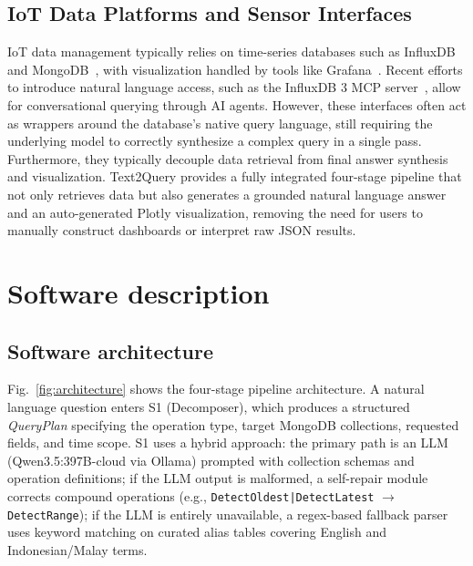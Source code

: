\documentclass[preprint,12pt,a4paper]{elsarticle}
\begin{document}
\subsection{IoT Data Platforms and Sensor Interfaces}
IoT data management typically relies on time-series databases such as InfluxDB~\cite{influxdb} and MongoDB~\cite{mongodb}, with visualization handled by tools like Grafana~\cite{grafana}. Recent efforts to introduce natural language access, such as the InfluxDB 3 MCP server~\cite{influx2025mcp}, allow for conversational querying through AI agents. However, these interfaces often act as wrappers around the database's native query language, still requiring the underlying model to correctly synthesize a complex query in a single pass. Furthermore, they typically decouple data retrieval from final answer synthesis and visualization. Text2Query provides a fully integrated four-stage pipeline that not only retrieves data but also generates a grounded natural language answer and an auto-generated Plotly visualization, removing the need for users to manually construct dashboards or interpret raw JSON results.

\section{Software description}

\subsection{Software architecture}

Fig.~\ref{fig:architecture} shows the four-stage pipeline architecture. A natural language question enters S1 (Decomposer), which produces a structured \emph{QueryPlan} specifying the operation type, target MongoDB collections, requested fields, and time scope. S1 uses a hybrid approach: the primary path is an LLM (Qwen3.5:397B-cloud via Ollama) prompted with collection schemas and operation definitions; if the LLM output is malformed, a self-repair module corrects compound operations (e.g., \texttt{DetectOldest|DetectLatest} $\rightarrow$ \texttt{DetectRange}); if the LLM is entirely unavailable, a regex-based fallback parser uses keyword matching on curated alias tables covering English and Indonesian/Malay terms.
\end{document}
